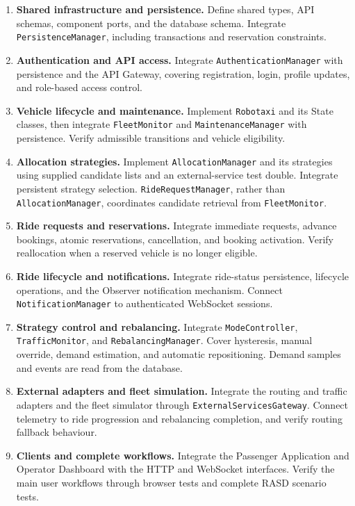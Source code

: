 \documentclass[11pt,a4paper,oneside]{report}
\newcommand{\code}[1]{\texttt{#1}}
\begin{document}
\begin{enumerate}
    \item \textbf{Shared infrastructure and persistence.}
    Define shared types, API schemas, component ports, and the database
    schema. Integrate \code{PersistenceManager}, including transactions
    and reservation constraints.

    \item \textbf{Authentication and API access.}
    Integrate \code{AuthenticationManager} with persistence and the API
    Gateway, covering registration, login, profile updates, and
    role-based access control.

    \item \textbf{Vehicle lifecycle and maintenance.}
    Implement \code{Robotaxi} and its State classes, then integrate
    \code{FleetMonitor} and \code{MaintenanceManager} with persistence.
    Verify admissible transitions and vehicle eligibility.

    \item \textbf{Allocation strategies.}
    Implement \code{AllocationManager} and its strategies using supplied
    candidate lists and an external-service test double.
    Integrate persistent strategy selection.
    \code{RideRequestManager}, rather than \code{AllocationManager},
    coordinates candidate retrieval from \code{FleetMonitor}.

    \item \textbf{Ride requests and reservations.}
    Integrate immediate requests, advance bookings, atomic reservations,
    cancellation, and booking activation. Verify reallocation when a
    reserved vehicle is no longer eligible.

    \item \textbf{Ride lifecycle and notifications.}
    Integrate ride-status persistence, lifecycle operations, and the
    Observer notification mechanism. Connect
    \code{NotificationManager} to authenticated WebSocket sessions.

    \item \textbf{Strategy control and rebalancing.}
    Integrate \code{ModeController}, \code{TrafficMonitor}, and
    \code{RebalancingManager}. Cover hysteresis, manual override,
    demand estimation, and automatic repositioning.
    Demand samples and events are read from the database.

    \item \textbf{External adapters and fleet simulation.}
    Integrate the routing and traffic adapters and the fleet simulator
    through \code{ExternalServicesGateway}. Connect telemetry to ride
    progression and rebalancing completion, and verify routing fallback
    behaviour.

    \item \textbf{Clients and complete workflows.}
    Integrate the Passenger Application and Operator Dashboard with
    the HTTP and WebSocket interfaces. Verify the main user workflows
    through browser tests and complete RASD scenario tests.
\end{enumerate}
\end{document}
